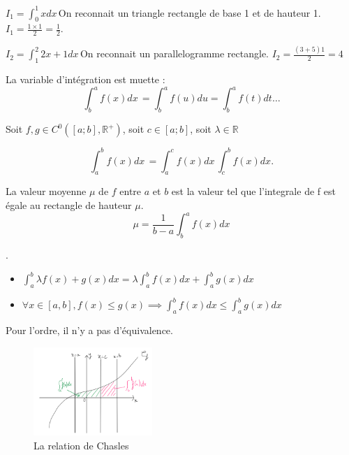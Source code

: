 \begin{eg}[Exemples]\par
    \(I_{1} = \int_{0}^{1} x dx \,\)On reconnait un triangle rectangle de base 1 et de hauteur 1. \(I_{1} = \frac{1 \times 1}{2} = \frac{1}{2}\). \par
    \(I_{2} = \int_{1}^{2} 2x+1 dx \,\)On reconnait un parallelogramme rectangle. \(I_{2} = \frac{(3+5)1}{2} = 4\)    
\end{eg}

\begin{remark}
    La variable d'intégration est muette : 
    \[
        \int_{b}^{a} f(x) dx \, = \int_{b}^{a} f(u) du =  \int_{b}^{a} f(t) dt \dots  
    \]
\end{remark}

\begin{corollary}[Propriétés]\label{pdef}
    Soit \(f,g \in C^{0}([a;b],\mathbb{R}^{+})\), soit \(c \in [a;b]\), soit \(\lambda \in \mathbb{R}\) 

    \begin{corollary}
        \[
            \int_{a}^{b} f(x) dx \, = \int_{a}^{c} f(x) dx \, \int_{c}^{b} f(x) dx. 
        \]  
    \end{corollary}

    \begin{corollary}
        La valeur moyenne \(\mu\) de \(f\) entre \(a\) et \(b\) est la valeur tel que l'integrale de f est égale au rectangle de hauteur \(\mu \).
        \[
            \mu = \frac{1}{b-a} \int_{b}^{a} f(x) dx
        \]  
    \end{corollary}

    \begin{corollary}.  \par
        \begin{itemize}
            \item \( \int_{a}^{b} \lambda f(x) + g(x) dx = \lambda \int_{a}^{b} f(x) dx + \int_{a}^{b} g(x) dx\) 
            \item \(\forall x \in [a,b], f(x) \leq g(x) \implies \int_{a}^{b} f(x) dx \leq \int_{a}^{b} g(x) dx\) 
        \end{itemize}
        Pour l'ordre, il n'y a pas d'équivalence.
    \end{corollary}
\end{corollary}

\begin{figure}[!htb]
    \centering
    \includegraphics[width=0.4\textwidth]{SCHEMA-2.png}
    \caption{La relation de Chasles}
    \label{fig:SCHEMA-2}
\end{figure}

